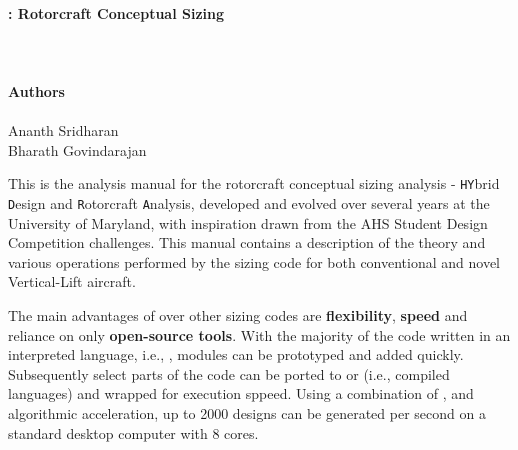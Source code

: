 
\thispagestyle{empty}
\hbox{\ }
\vspace{1in}
\renewcommand{\baselinestretch}{1}
\small\normalsize
\begin{center}
\large{\textbf{\hydra: Rotorcraft Conceptual Sizing}}\\
\ \\
\large{ }
\ \\
\ \\
\textbf{Authors}
\ \\
\ \\
Ananth Sridharan \\
Bharath Govindarajan \\
\end{center}
\noindent
This is the analysis manual for the rotorcraft conceptual sizing  analysis \textbf{\hydra} - \texttt{HY}brid \texttt{D}esign and \texttt{R}otorcraft \texttt{A}nalysis, developed and evolved over several years at the University of Maryland, with inspiration  drawn from the AHS Student Design Competition challenges. This manual contains a description of the theory and various operations performed by the sizing code for both conventional and novel Vertical-Lift aircraft.

\vspace{1cm}

The main advantages of \hydra \spc over other sizing codes are \textbf{flexibility}, \textbf{speed} and reliance on only \textbf{open-source tools}. With the majority of the code written in an interpreted language, i.e., \python, modules can be prototyped and added quickly. Subsequently select parts of the code can be ported to  or  (i.e., compiled languages) and wrapped for execution sppeed. Using a combination of ,  and algorithmic acceleration, up to 2000 designs can be generated per second on a standard desktop computer with 8 cores. 

